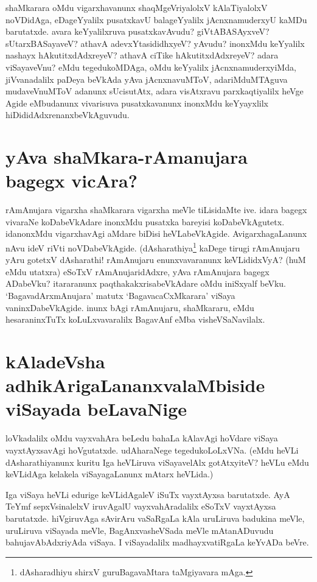 shaMkarara oMdu vigarxhavanunx shaqMgeVriyalolxV kAlaTiyalolxV noVDidAga, eDageYyalilx pusatxkavU balageYyalilx jAcnxnamuderxyU kaMDu barutatxde. avara keYyalilxruva pusatxkavAvudu? giVtABASAyxveV? sUtarxBASayaveV? athavA adevxYtasididhxyeV? yAvudu? inonxMdu keYyalilx nashayx hAkutitxdAdxreyeV? athavA ciTike hAkutitxdAdxreyeV? adara viSayaveVnu? eMdu tegedukoMDAga, oMdu keYyalilx  jAcnxnamuderxyiMda, jiVvanadalilx paDeya beVkAda yAva jAcnxnavuMToV, adariMduMTAguva mudaveVnuMToV adanunx sUcisutAtx, adara visAtxravu parxkaqtiyalilx heVge Agide eMbudanunx vivarisuva pusatxkavanunx  inonxMdu keYyayxlilx hiDididAdxrenanxbeVkAguvudu.

\section*{yAva shaMkara-rAmanujara bagegx vicAra?}

rAmAnujara vigarxha shaMkarara vigarxha meVle tiLisidaMte ive. idara bagegx vivaraNe koDabeVkAdare inonxMdu pusatxka bareyisi koDabeVkAgutetx. idanonxMdu vigarxhavAgi aMdare biDisi heVLabeVkAgide. AvigarxhagaLanunx nAvu ideV riVti noVDabeVkAgide. (dAsharathiya\footnote{dAsharadhiyu shirxV guruBagavaMtara taMgiyavara mAga.} kaDege tirugi rAmAnujaru yAru gotetxV dAsharathi! rAmAnujaru enunxvavaranunx keVLididxVyA? (huM eMdu utatxra) eSoTxV rAmAnujaridAdxre, yAva rAmAnujara bagegx ADabeVku? itararanunx  paqthakakxrisabeVkAdare oMdu iniSxyalf beVku. `BagavadArxmAnujara' matutx `BagavacaCxMkarara' viSaya vaninxDabeVkAgide. inunx bAgi rAmAnujaru, shaMkararu, eMdu hesaraninxTuTx koLuLxvavaralilx BagavAnf eMba visheVSaNavilalx.

\section*{kAladeVsha adhikArigaLananxvalaMbiside viSayada beLavaNige}

loVkadalilx oMdu vayxvahAra beLedu bahaLa kAlavAgi hoVdare viSaya vayxtAyxsavAgi hoVgutatxde. udAharaNege tegedukoLoLxVNa. (eMdu heVLi dAsharathiyanunx kuritu Iga heVLiruva viSayavelAlx gotAtxyiteV? heVLu eMdu keVLidAga kelakela viSayagaLanunx mAtarx heVLida.)

Iga viSaya heVLi edurige keVLidAgaleV iSuTx  vayxtAyxsa barutatxde. AyA TeYmf sepxVsinalelxV iruvAgalU vayxvahAradalilx eSoTxV vayxtAyxsa barutatxde. hiVgiruvAga sAvirAru vaSaRgaLa kAla uruLiruva badukina meVle, uruLiruva viSayada meVle, BagAnxvasheVSada meVle mAtanADuvudu bahujavAbAdxriyAda viSaya. I viSayadalilx madhayxvatiRgaLa keYvADa beVre.

